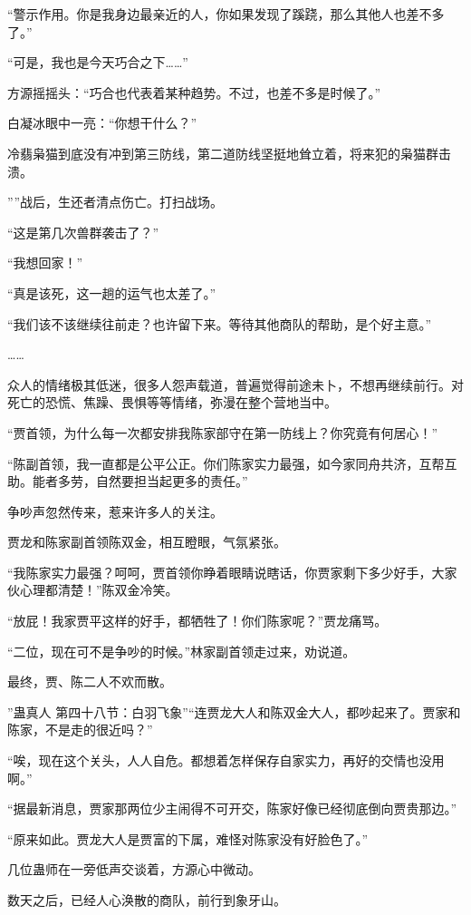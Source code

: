 \begin{this_body}
“警示作用。你是我身边最亲近的人，你如果发现了蹊跷，那么其他人也差不多了。”

“可是，我也是今天巧合之下……”

方源摇摇头：“巧合也代表着某种趋势。不过，也差不多是时候了。”

白凝冰眼中一亮：“你想干什么？”

冷翡枭猫到底没有冲到第三防线，第二道防线坚挺地耸立着，将来犯的枭猫群击溃。

””战后，生还者清点伤亡。打扫战场。

“这是第几次兽群袭击了？”

“我想回家！”

“真是该死，这一趟的运气也太差了。”

“我们该不该继续往前走？也许留下来。等待其他商队的帮助，是个好主意。”

……

众人的情绪极其低迷，很多人怨声载道，普遍觉得前途未卜，不想再继续前行。对死亡的恐慌、焦躁、畏惧等等情绪，弥漫在整个营地当中。

“贾首领，为什么每一次都安排我陈家部守在第一防线上？你究竟有何居心！”

“陈副首领，我一直都是公平公正。你们陈家实力最强，如今家同舟共济，互帮互助。能者多劳，自然要担当起更多的责任。”

争吵声忽然传来，惹来许多人的关注。

贾龙和陈家副首领陈双金，相互瞪眼，气氛紧张。

“我陈家实力最强？呵呵，贾首领你睁着眼睛说瞎话，你贾家剩下多少好手，大家伙心理都清楚！”陈双金冷笑。

“放屁！我家贾平这样的好手，都牺牲了！你们陈家呢？”贾龙痛骂。

“二位，现在可不是争吵的时候。”林家副首领走过来，劝说道。

最终，贾、陈二人不欢而散。

”蛊真人 第四十八节：白羽飞象”“连贾龙大人和陈双金大人，都吵起来了。贾家和陈家，不是走的很近吗？”

“唉，现在这个关头，人人自危。都想着怎样保存自家实力，再好的交情也没用啊。”

“据最新消息，贾家那两位少主闹得不可开交，陈家好像已经彻底倒向贾贵那边。”

“原来如此。贾龙大人是贾富的下属，难怪对陈家没有好脸色了。”

几位蛊师在一旁低声交谈着，方源心中微动。

数天之后，已经人心涣散的商队，前行到象牙山。


\end{this_body}
